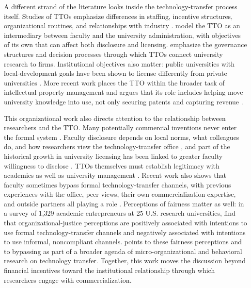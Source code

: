 A different strand of the literature looks inside the technology-transfer process itself. Studies of TTOs emphasize differences in staffing, incentive structures, organizational routines, and relationships with industry \citep{SiegelWaldmanLink2003,SiegelWaldmanAtwater2004,ThursbyKemp2002,MarkmanEtAl2005,OsheaEtAl2005}. \citet{JensenThursbyThursby2003} model the TTO as an intermediary between faculty and the university administration, with objectives of its own that can affect both disclosure and licensing. \citet{DebackereVeugelers2005} emphasize the governance structures and decision processes through which TTOs connect university research to firms. Institutional objectives also matter: public universities with local-development goals have been shown to license differently from private universities \citep{BelenzonSchankerman2009}. More recent work places the TTO within the broader task of intellectual-property management and argues that its role includes helping move university knowledge into use, not only securing patents and capturing revenue \citep{HolgerssonEtAl2019,AaboenHolgersson2019}.

This organizational work also directs attention to the relationship between researchers and the TTO. Many potentially commercial inventions never enter the formal system \citep{JensenThursbyThursby2003}. Faculty disclosure depends on local norms, what colleagues do, and how researchers view the technology-transfer office \citep{OwenSmithPowell2001,BercovitzFeldman2008}, and part of the historical growth in university licensing has been linked to greater faculty willingness to disclose \citep{ThursbyThursby2002}. TTOs themselves must establish legitimacy with academics as well as university management \citep{OKaneEtAl2015}. Recent work also shows that faculty sometimes bypass formal technology-transfer channels, with previous experiences with the office, peer views, their own commercialization expertise, and outside partners all playing a role \citep{HalilemDiop2025}. Perceptions of fairness matter as well: in a survey of 1,329 academic entrepreneurs at 25 U.S. research universities, \citet{WaldmanEtAl2022} find that organizational-justice perceptions are positively associated with intentions to use formal technology-transfer channels and negatively associated with intentions to use informal, noncompliant channels. \citet{Siegel2026} points to these fairness perceptions and to bypassing as part of a broader agenda of micro-organizational and behavioral research on technology transfer. Together, this work moves the discussion beyond financial incentives toward the institutional relationship through which researchers engage with commercialization.


